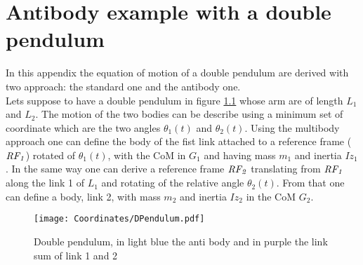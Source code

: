 \chapter{Antibody example with a double pendulum}
\label{app:AntiBody}
%
In this appendix the equation of motion of a double pendulum are derived with two approach: the standard one and the antibody one.\\
Lets suppose to have a double pendulum in figure \ref{fig:DoublePendulum} whose arm are of length $L_1$ and $L_2$. The motion of the two bodies can be describe using a minimum set of coordinate which are the two angles $\theta_1(t)$ and $\theta_2(t)$. Using the multibody approach one can define the body of the fist link attached to a reference frame ($\it RF_1$) rotated of $\theta_1(t)$, with the CoM in $G_1$ and having mass $m_1$ and inertia $Iz_1$. In the same way one can derive a reference frame $\it RF_2$ translating from $\it RF_1$ along the link 1 of $L_1$ and rotating of the relative angle $\theta_2(t)$. From that one can define a body, link 2, with mass $m_2$ and inertia $Iz_2$ in the CoM $G_2$.
%
\begin{figure}[ht!]
    \centering
    \texttt{[image: Coordinates/DPendulum.pdf]}
    \caption{Double pendulum, in light blue the anti body and in purple the link sum of link 1 and 2}
    \label{fig:DoublePendulum}
\end{figure}
%
